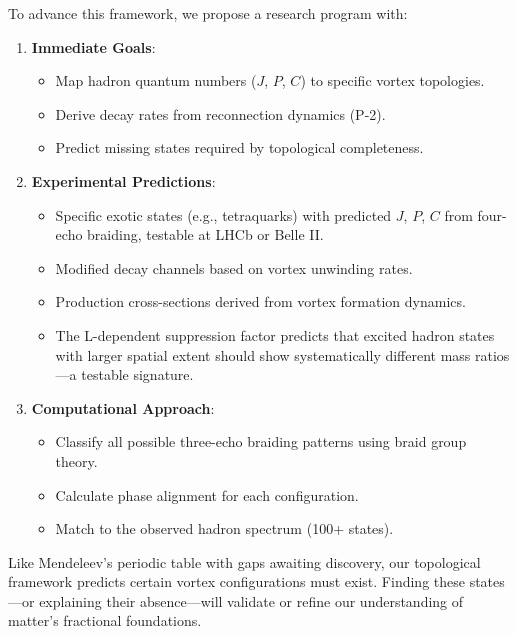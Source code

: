 To advance this framework, we propose a research program with:

\begin{enumerate}
\item \textbf{Immediate Goals}:
   \begin{itemize}
   \item Map hadron quantum numbers ($J$, $P$, $C$) to specific vortex topologies.
   \item Derive decay rates from reconnection dynamics (P-2).
   \item Predict missing states required by topological completeness.
   \end{itemize}
\item \textbf{Experimental Predictions}:
   \begin{itemize}
   \item Specific exotic states (e.g., tetraquarks) with predicted $J$, $P$, $C$ from four-echo braiding, testable at LHCb or Belle II.
   \item Modified decay channels based on vortex unwinding rates.
   \item Production cross-sections derived from vortex formation dynamics.
   \item The L-dependent suppression factor predicts that excited hadron states with larger spatial extent should show systematically different mass ratios—a testable signature.
   \end{itemize}
\item \textbf{Computational Approach}:
   \begin{itemize}
   \item Classify all possible three-echo braiding patterns using braid group theory.
   \item Calculate phase alignment for each configuration.
   \item Match to the observed hadron spectrum (100+ states).
   \end{itemize}
\end{enumerate}

Like Mendeleev's periodic table with gaps awaiting discovery, our topological framework predicts certain vortex configurations must exist. Finding these states---or explaining their absence---will validate or refine our understanding of matter's fractional foundations.

